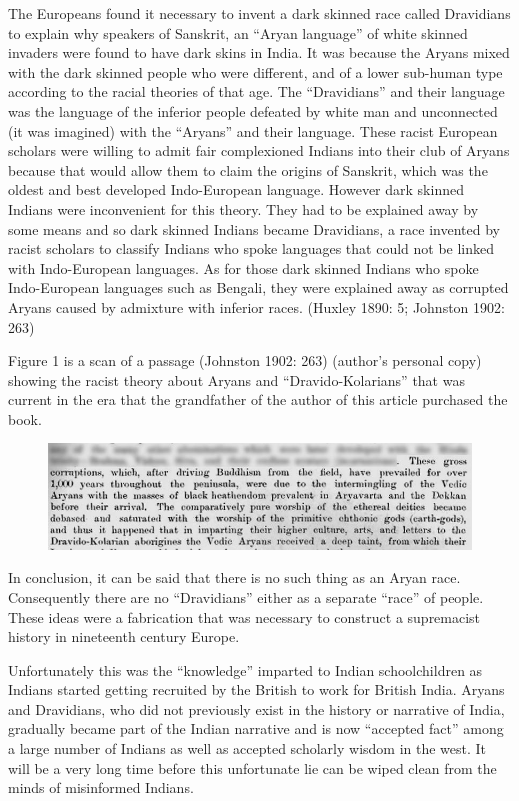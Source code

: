The Europeans found it necessary to invent a dark skinned race called Dravidians to explain why speakers of Sanskrit, an “Aryan language” of white skinned invaders were found to have dark skins in India. It was because the Aryans mixed with the dark skinned people who were different, and of a lower sub-human type according to the racial theories of that age. The “Dravidians” and their language was the language of the inferior people defeated by white man and unconnected (it was imagined) with the “Aryans” and their language. These racist European scholars were willing to admit fair complexioned Indians into their club of Aryans because that would allow them to claim the origins of Sanskrit, which was the oldest and best developed Indo-European language. However dark skinned Indians were inconvenient for this theory. They had to be explained away by some means and so dark skinned Indians became Dravidians, a race invented by racist scholars to classify Indians who spoke languages that could not be linked with Indo-European languages. As for those dark skinned Indians who spoke Indo-European languages such as Bengali, they were explained away as corrupted Aryans caused by admixture with inferior races. (Huxley 1890: 5; Johnston 1902: 263)

\newpage

Figure 1 is a scan of a passage (Johnston 1902: 263) (author’s personal copy) showing the racist theory about Aryans and “Dravido-Kolarians” that was current in the era that the grandfather of the author of this article purchased the book.

\begin{figure}[!htbp]
\includegraphics[scale=0.35]{"images/7-01.jpg"}
\caption{}\label{art7-fig01}
\end{figure}

In conclusion, it can be said that there is no such thing as an Aryan race. Consequently there are no “Dravidians” either as a separate “race” of people. These ideas were a fabrication that was necessary to construct a supremacist history in nineteenth century Europe.

Unfortunately this was the “knowledge” imparted to Indian schoolchildren as Indians started getting recruited by the British to work for British India. Aryans and Dravidians, who did not previously exist in the history or narrative of India, gradually became part of the Indian narrative and is now “accepted fact” among a large number of Indians as well as accepted scholarly wisdom in the west. It will be a very long time before this unfortunate lie can be wiped clean from the minds of misinformed Indians.


